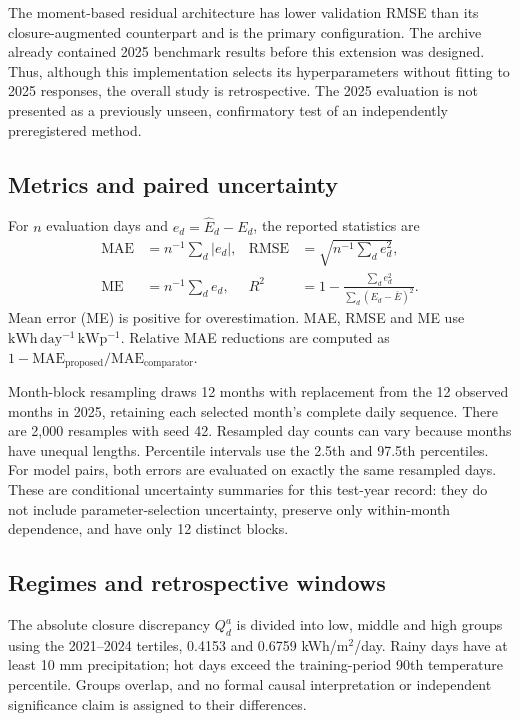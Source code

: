 \documentclass[11pt,a4paper]{article}
\newcommand{\unit}{\ensuremath{\mathrm{kWh\,day^{-1}\,kWp^{-1}}}}
\begin{document}
The moment-based residual architecture has lower validation RMSE than its closure-augmented counterpart and is the primary configuration. The archive already contained 2025 benchmark results before this extension was designed. Thus, although this implementation selects its hyperparameters without fitting to 2025 responses, the overall study is retrospective. The 2025 evaluation is not presented as a previously unseen, confirmatory test of an independently preregistered method.

\subsection{Metrics and paired uncertainty}
For $n$ evaluation days and $e_d=\widehat E_d-E_d$, the reported statistics are
\begin{align}
 \mathrm{MAE}&=n^{-1}\sum_d|e_d|,&
 \mathrm{RMSE}&=\sqrt{n^{-1}\sum_de_d^2},\nonumber\\
 \mathrm{ME}&=n^{-1}\sum_de_d,&
 R^2&=1-\frac{\sum_de_d^2}{\sum_d(E_d-\bar E)^2}.
 \label{eq:metrics}
\end{align}
Mean error (ME) is positive for overestimation. MAE, RMSE and ME use \unit{}. Relative MAE reductions are computed as $1-\mathrm{MAE}_{\mathrm{proposed}}/\mathrm{MAE}_{\mathrm{comparator}}$.

Month-block resampling draws 12 months with replacement from the 12 observed months in 2025, retaining each selected month's complete daily sequence. There are 2,000 resamples with seed 42. Resampled day counts can vary because months have unequal lengths. Percentile intervals use the 2.5th and 97.5th percentiles. For model pairs, both errors are evaluated on exactly the same resampled days. These are conditional uncertainty summaries for this test-year record: they do not include parameter-selection uncertainty, preserve only within-month dependence, and have only 12 distinct blocks.

\subsection{Regimes and retrospective windows}
The absolute closure discrepancy $Q_d^a$ is divided into low, middle and high groups using the 2021--2024 tertiles, 0.4153 and 0.6759 kWh/m$^2$/day. Rainy days have at least 10 mm precipitation; hot days exceed the training-period 90th temperature percentile. Groups overlap, and no formal causal interpretation or independent significance claim is assigned to their differences.
\end{document}
